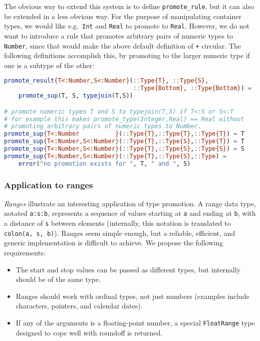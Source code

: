 The obvious way to extend this system is to define \texttt{promote\_rule},
but it can also be extended in a less obvious way.
For the purpose of manipulating container types, we would like e.g.\ \texttt{Int}
and \texttt{Real} to promote to \texttt{Real}.
However, we do not want to introduce a rule that promotes arbitrary pairs of
numeric types to \texttt{Number}, since that would make the above
default definition of \texttt{+} circular.
The following definitions accomplish this, by promoting to the larger
numeric type if one is a subtype of the other:

\begin{singlespace}
\begin{lstlisting}[language=julia]
promote_result{T<:Number,S<:Number}(::Type{T}, ::Type{S},
                                    ::Type{Bottom}, ::Type{Bottom}) =
    promote_sup(T, S, typejoin(T,S))

# promote numeric types T and S to typejoin(T,S) if T<:S or S<:T
# for example this makes promote_type(Integer,Real) == Real without
# promoting arbitrary pairs of numeric types to Number.
promote_sup{T<:Number          }(::Type{T},::Type{T},::Type{T}) = T
promote_sup{T<:Number,S<:Number}(::Type{T},::Type{S},::Type{T}) = T
promote_sup{T<:Number,S<:Number}(::Type{T},::Type{S},::Type{S}) = S
promote_sup{T<:Number,S<:Number}(::Type{T},::Type{S},::Type) =
    error("no promotion exists for ", T, " and ", S)
\end{lstlisting}
\end{singlespace}


\subsubsection{Application to ranges}

\emph{Ranges} illustrate an interesting application of type promotion.
A range data type, notated \texttt{a:s:b}, represents a sequence of values
starting at \texttt{a} and ending at \texttt{b}, with a distance of \texttt{s}
between elements (internally, this notation is translated to
\texttt{colon(a, s, b)}).
Ranges seem simple enough, but a reliable, efficient, and generic implementation
is difficult to achieve.
We propose the following requirements:

\begin{itemize}
\item The start and stop values can be passed as different types, but internally
  should be of the same type.
\item Ranges should work with ordinal types, not just numbers (examples include
  characters, pointers, and calendar dates).
\item If any of the arguments is a floating-point number, a special
  \texttt{FloatRange} type designed to cope well with roundoff is returned.
\end{itemize}

